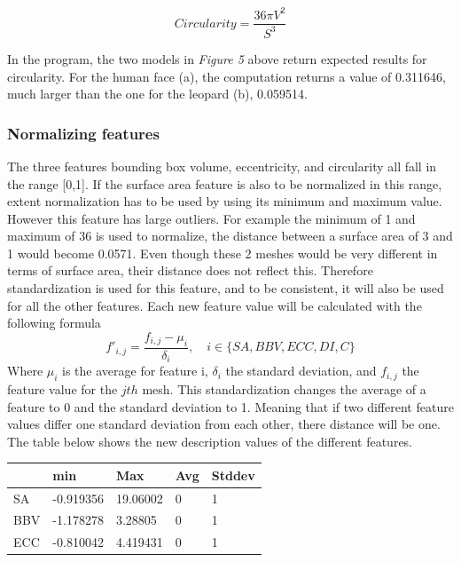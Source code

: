 \documentclass{bigdata}
\begin{document}
\begin{equation}
Circularity = \frac{36\pi V^2}{S^3}
\end{equation}

In the program, the two models in \textit{Figure 5} above return expected results for circularity. For the human face (a), the computation returns a value of 0.311646, much larger than the one for the leopard (b), 0.059514.

\subsubsection{Normalizing  features}
The three features bounding box volume, eccentricity, and circularity all fall in the range [0,1]. If the surface area feature is also to be normalized in this range, extent normalization has to be used by using its minimum and maximum value. However this feature has large outliers. For example the minimum of 1 and maximum of 36 is used to normalize, the distance between a surface area of 3 and 1 would become 0.0571. Even though these 2 meshes would be very different in terms of surface area, their distance does not reflect this. Therefore standardization is used for this feature, and to be consistent, it will also be used for all the other  features. 
Each new feature value will be calculated with the following formula
\begin{equation}
f'_{i,j} = \frac{f_{i,j} - \mu_i}{\delta_i},\quad i \in \{SA,BBV,ECC,DI,C\}
\end{equation}
Where $\mu_i$ is the average for feature i, $\delta_i$ the standard deviation, and $f_{i,j}$ the feature value for the $jth$ mesh. This standardization changes  the average of a feature to 0 and the standard deviation to 1. Meaning that if two different feature values differ one standard deviation from each other, there distance will be one. The table below shows the new description values of the different features.

\begin{center}
    \begin{tabular}{ | l | l | l | l | l |}
    \hline
    & min & Max & Avg & Stddev \\ \hline
    SA & -0.919356 & 19.06002 & 0 & 1 \\ \hline
    BBV & -1.178278 & 3.28805 & 0 & 1 \\ \hline
    ECC & -0.810042 & 4.419431 & 0 & 1 \\ \hline
    \end{tabular}
\end{center}
\end{document}
